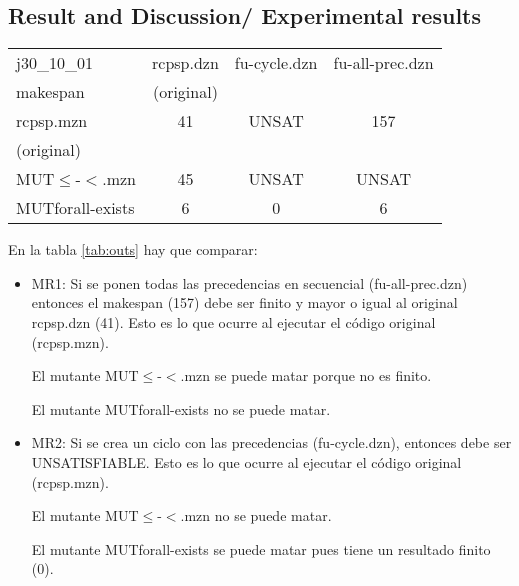 \newpage
\subsection{Result and Discussion/ Experimental results}

\begin{table*}[htb]
    \centering
    \begin{tabular}{l|c|c|c}

    j30\_10\_01  &  rcpsp.dzn  & fu-cycle.dzn & fu-all-prec.dzn\\
    makespan  & (original) &  & \\
    \hline
     rcpsp.mzn    & 41 & UNSAT & 157 \\
     (original)   &  &  & \\
     \hline
    
    MUT$\leq$-$<$.mzn & 45 & UNSAT & UNSAT \\
     \hline
    
    MUTforall-exists  & 6 & 0& 6 \\
     \hline
    \end{tabular}
    \caption{rows: codes (mutations); columns: data (follow-ups). UNSAT is the sort-name of UNSATISFIABLE }
    \label{tab:outs}
\end{table*}

En la tabla \ref{tab:outs} hay que comparar:
\begin{itemize}
    \item MR1: Si se ponen todas las precedencias en secuencial (fu-all-prec.dzn) entonces el makespan (157) debe ser finito y mayor o igual al original rcpsp.dzn (41). Esto es lo que ocurre al ejecutar el código original (rcpsp.mzn).

    El mutante MUT$\leq$-$<$.mzn se puede matar porque no es finito.

    El mutante MUTforall-exists no se puede matar.

    \item MR2: Si se crea un ciclo con las precedencias (fu-cycle.dzn), entonces debe ser UNSATISFIABLE. Esto es lo que ocurre al ejecutar el código original (rcpsp.mzn).

    El mutante MUT$\leq$-$<$.mzn no se puede matar.

    El mutante MUTforall-exists se puede matar pues tiene un resultado finito (0).

\end{itemize}
